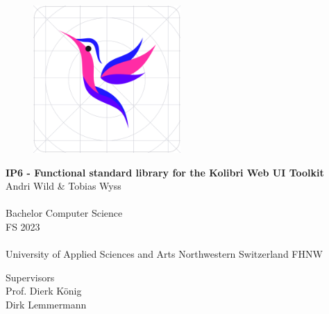 






\begin{titlepage}
\begin{center}

    \begin{figure}[H]
        \centering
        \includegraphics[width=0.50\textwidth]{./frontmatter/pictures/kolibri-logo}
    \end{figure}

    \vspace*{1cm}
    {\huge \bfseries IP6 - Functional standard library for the Kolibri Web UI
    Toolkit  \\ }
    \vspace{2cm}
    {\large 
      Andri Wild \& Tobias Wyss\\

    	~\\
    	Bachelor Computer Science\\
    	\vspace{3.5cm}
    	FS 2023\\
    	~\\
    	University of Applied Sciences and Arts Northwestern Switzerland FHNW\\
    }




{\large
	Supervisors \\[\baselineskip]
	Prof. Dierk König\\
	Dirk Lemmermann\\[1cm]
}
\end{center}
\end{titlepage}

\begin{titlepage}
\thispagestyle{empty}
\newpage
\mbox{}
\end{titlepage}
